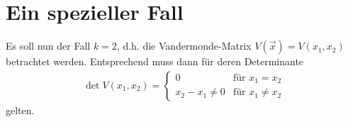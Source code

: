 \documentclass[12pt,a4paper]{scrartcl}
\DeclareMathOperator{\dete}{det}
\begin{document}
\section{Ein spezieller Fall}
  Es soll nun der Fall $k = 2$, d.h. die Vandermonde-Matrix $V(\vec{x}) = V(x_1,x_2)$
  betrachtet werden. Entsprechend muss dann für deren Determinante
  \begin{align}
    \dete V(x_1,x_2) =
    \begin{cases}
      0 & \text{für }x_1=x_2\\
      x_2 - x_1 \neq 0 & \text{für } x_1 \neq x_2 \nonumber
    \end{cases}
  \end{align}
  gelten.
\end{document}
